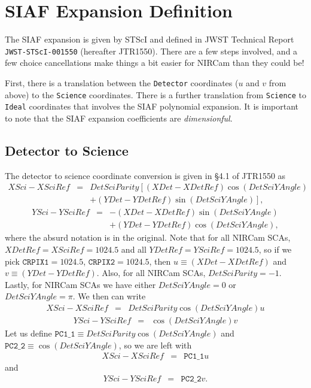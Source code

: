 \documentclass[10pt]{article}
\newcommand{\NCu}{\ensuremath{\mathtt{PC1\_1}}}
\newcommand{\NCv}{\ensuremath{\mathtt{PC2\_2}}}
\begin{document}
\section{SIAF Expansion Definition}

The SIAF expansion is given by STScI and defined in JWST Technical Report {\tt JWST-STScI-001550} (hereafter JTR1550). There
are a few steps involved, and a few choice cancellations make things a bit easier for NIRCam than they
could be!

First, there is a translation between the {\tt Detector} coordinates ($u$ and $v$ from above) to the
{\tt Science} coordinates. There is a further translation from {\tt Science} to {\tt Ideal} coordinates
that involves the SIAF polynomial expansion. It is important to note that the SIAF expansion coefficients
are \emph{dimensionful}.

\subsection{Detector to Science}

The detector to science coordinate conversion is given in \S 4.1 of JTR1550 as
\begin{eqnarray}
XSci - XSciRef &=& DetSciParity\left[\left(XDet - XDetRef\right)\cos\left(DetSciYAngle\right)\right.\\
               &&+ \left.\left(YDet - YDetRef\right)\sin\left(DetSciYAngle\right)\right],\nonumber
\end{eqnarray}
\begin{eqnarray}
YSci - YSciRef &=& -\left(XDet - XDetRef\right)\sin\left(DetSciYAngle\right)\\ 
               &&+ \left(YDet - YDetRef\right)\cos\left(DetSciYAngle\right),\nonumber
\end{eqnarray}
\noindent
where the absurd notation is in the original.  Note that for all NIRCam SCAs, $XDetRef=XSciRef=1024.5$
and all $YDetRef=YSciRef=1024.5$, so if we pick $\mathtt{CRPIX1}=1024.5$, $\mathtt{CRPIX2}=1024.5$,
then $u\equiv\left(XDet - XDetRef\right)$ and $v\equiv\left(YDet - YDetRef\right)$. Also, for
all NIRCam SCAs, $DetSciParity=-1$. Lastly, for NIRCam SCAs we have either $DetSciYAngle=0$ or
$DetSciYAngle=\pi$. We then can write
\begin{eqnarray}
XSci - XSciRef &=& DetSciParity\cos\left(DetSciYAngle\right) u
\end{eqnarray}
\begin{eqnarray}
YSci - YSciRef &=& \cos\left(DetSciYAngle\right) v
\end{eqnarray}
\noindent
Let us define $\NCu \equiv DetSciParity\cos\left(DetSciYAngle\right)$ and 
$\NCv \equiv \cos\left(DetSciYAngle\right)$, so we are left with
\begin{eqnarray}
XSci - XSciRef &=& \NCu u
\end{eqnarray}
\noindent
and
\begin{eqnarray}
YSci - YSciRef &=& \NCv v.
\end{eqnarray}
\end{document}
